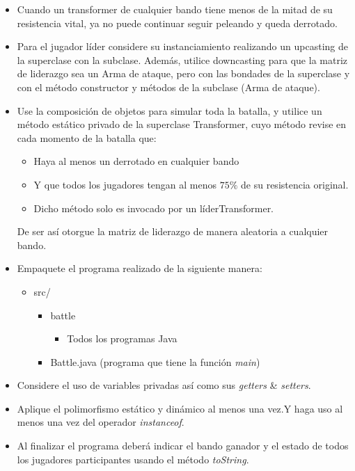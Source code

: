 \documentclass[12pt]{article}
\begin{document}
\begin{enumerate}[label = \arabic{enumi}]
\begin{itemize}
      \item Cuando un transformer de cualquier bando tiene menos de la mitad de su resistencia vital, ya no puede continuar seguir peleando y queda derrotado.
      \item Para el jugador líder considere su instanciamiento realizando un upcasting de la superclase con la subclase. Además, utilice downcasting para que la matriz de liderazgo sea un Arma de ataque, pero con las bondades de la superclase y con el método constructor y métodos de la subclase (Arma de ataque).
      \item Use la composición de objetos para simular toda la batalla, y utilice un método estático privado de la superclase Transformer, cuyo método revise en cada momento de la batalla que:
      \begin{itemize}
        \item Haya al menos un derrotado en cualquier bando
        \item Y que todos los jugadores tengan al menos $75\%$ de su resistencia original.
        \item Dicho método solo es invocado por un líderTransformer.
      \end{itemize}
      De ser así otorgue la matriz de liderazgo de manera aleatoria a cualquier bando.

      \item Empaquete el programa realizado de la siguiente manera:
      \begin{itemize}
        \item src/
        \begin{itemize}
          \item battle
          \begin{itemize}
            \item Todos los programas Java
          \end{itemize}
          \item Battle.java (programa que tiene la función \textit{main})
        \end{itemize}
      \end{itemize}

      \item Considere el uso de variables privadas así como sus \textit{getters} \& \textit{setters}.
      \item Aplique el polimorfismo estático y dinámico al menos una vez.Y haga uso al menos una vez del operador \textit{instanceof}.
      \item Al finalizar el programa deberá indicar el bando ganador y el estado de todos los jugadores participantes usando el método \textit{toString}.
    \end{itemize}
  \end{enumerate}
\end{document}
